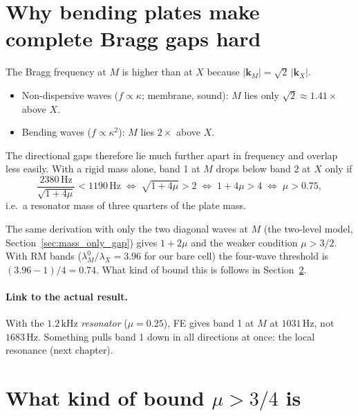 \section{Why bending plates make complete Bragg gaps hard}

The Bragg frequency at $M$ is higher than at $X$ because
$|\mathbf{k}_M| = \sqrt{2}\,|\mathbf{k}_X|$.
\begin{itemize}
  \item Non-dispersive waves ($f \propto \kappa$; membrane, sound): $M$ lies
        only $\sqrt{2} \approx 1.41\times$ above $X$.
  \item Bending waves ($f \propto \kappa^2$): $M$ lies $2\times$ above $X$.
\end{itemize}
The directional gaps therefore lie much further apart in frequency and overlap
less easily. With a rigid mass alone, band 1 at $M$ drops below band 2 at $X$
only if
\begin{equation}
  \frac{2380\,\mathrm{Hz}}{\sqrt{1 + 4\mu}} < 1190\,\mathrm{Hz}
  \;\Longleftrightarrow\; \sqrt{1+4\mu} > 2
  \;\Longleftrightarrow\; 1 + 4\mu > 4
  \;\Longleftrightarrow\; \mu > 0.75,
\end{equation}
i.e.\ a resonator mass of three quarters of the plate mass.

The same derivation with only the two diagonal waves at $M$ (the two-level model,
Section~\ref{sec:mass_only_gap}) gives $1 + 2\mu$ and the weaker condition
$\mu > 3/2$. With RM bands ($\lambda_M^0/\lambda_X = 3.96$ for our bare cell) the
four-wave threshold is $(3.96 - 1)/4 = 0.74$. What kind of bound this is follows in
Section~\ref{sec:bound_type}.

\paragraph{Link to the actual result.}
With the $1.2\,\mathrm{kHz}$ \emph{resonator} ($\mu = 0.25$), FE gives band 1
at $M$ at $1031\,\mathrm{Hz}$, not $1683\,\mathrm{Hz}$. Something pulls band 1
down in all directions at once: the local resonance
(next chapter).

\section{What kind of bound $\mu > 3/4$ is}
\label{sec:bound_type}


